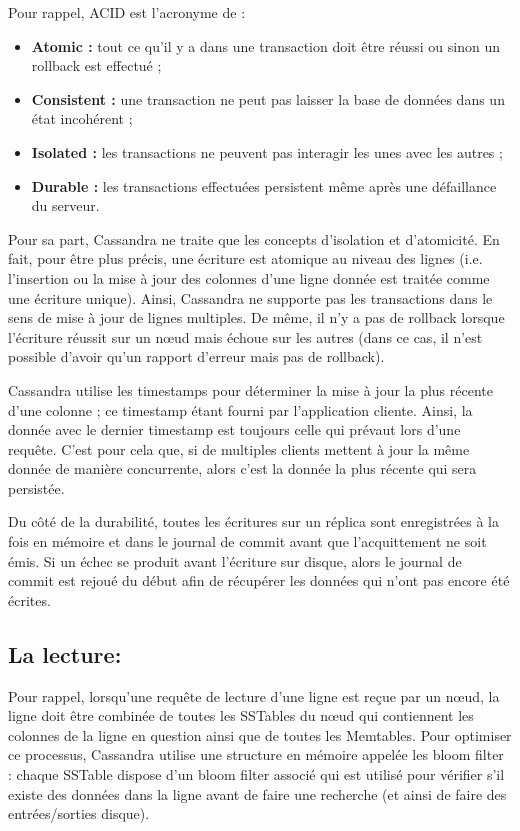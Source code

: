 Pour rappel, ACID est l'acronyme de :
\begin{itemize}[label=\textbullet]
	\item \textbf{Atomic :} tout ce qu'il y a dans une transaction doit être réussi ou sinon un rollback est effectué ;
	\item \textbf{Consistent :} une transaction ne peut pas laisser la base de données dans un état incohérent ;
	\item \textbf{Isolated :} les transactions ne peuvent pas interagir les unes avec les autres ;
	\item \textbf{Durable :} les transactions effectuées persistent même après une défaillance du serveur.
\end{itemize}

Pour sa part, Cassandra ne traite que les concepts d'isolation et d'atomicité. En fait, pour être plus précis, une écriture est atomique au niveau des lignes (i.e. l'insertion ou la mise à jour des colonnes d'une ligne donnée est traitée comme une écriture unique). Ainsi, Cassandra ne supporte pas les transactions dans le sens de mise à jour de lignes multiples. De même, il n'y a pas de rollback lorsque l'écriture réussit sur un nœud mais échoue sur les autres (dans ce cas, il n'est possible d'avoir qu'un rapport d'erreur mais pas de rollback).

Cassandra utilise les timestamps pour déterminer la mise à jour la plus récente d'une colonne ; ce timestamp étant fourni par l'application cliente. Ainsi, la donnée avec le dernier timestamp est toujours celle qui prévaut lors d'une requête. C'est pour cela que, si de multiples clients mettent à jour la même donnée de manière concurrente, alors c'est la donnée la plus récente qui sera persistée.

Du côté de la durabilité, toutes les écritures sur un réplica sont enregistrées à la fois en mémoire et dans le journal de commit avant que l'acquittement ne soit émis. Si un échec se produit avant l'écriture sur disque, alors le journal de commit est rejoué du début afin de récupérer les données qui n'ont pas encore été écrites.

\subsection{La lecture:}
Pour rappel, lorsqu'une requête de lecture d'une ligne est reçue par un nœud, la ligne doit être combinée de toutes les SSTables du nœud qui contiennent les colonnes de la ligne en question ainsi que de toutes les Memtables. Pour optimiser ce processus, Cassandra utilise une structure en mémoire appelée les bloom filter : chaque SSTable dispose d'un bloom filter associé qui est utilisé pour vérifier s'il existe des données dans la ligne avant de faire une recherche (et ainsi de faire des entrées/sorties disque).

